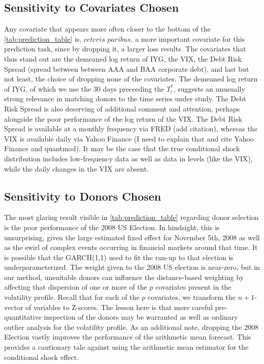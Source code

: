 \documentclass[11pt,3p,review,authoryear]{elsarticle}
\theoremstyle{definition}
\begin{document}
\subsection{Sensitivity to Covariates Chosen}
Any covariate that appears more often closer to the bottom of the \ref{tab:prediction_table} is, $\textit{ceteris paribus}$, a more important covariate for this prediction task, since by dropping it, a larger loss results.  The covariates that thus stand out are the demeaned log return of IYG, the VIX, the Debt Risk Spread (spread between between AAA and BAA corporate debt), and last but not least, the choice of dropping none of the covariates.  The demeaned log return of IYG, of which we use the 30 days preceeding the $T_{i}^{*}$, suggests an unusually strong relevance in matching donors to the time series under study.  The Debt Risk Spread is also deserving of additional comment and attention, perhaps alongside the poor performance of the log return of the VIX.  The Debt Risk Spread is available at a monthly frequency via FRED (add citation), whereas the VIX is available daily via Yahoo Finance (I need to explain that and cite Yahoo Finance and quantmod).  It may be the case that the true conditional shock distribution includes low-frequency data as well as data in levels (like the VIX), while the daily changes in the VIX are absent.

\subsection{Sensitivity to Donors Chosen}

The most glaring result visible in \ref{tab:prediction_table} regarding donor selection is the poor performance of the 2008 US Election.  In hindsight, this is unsurprising, given the large estimated fixed effect for November 5th, 2008 as well as the swirl of complex events occurring in financial markets around that time.  It is possible that the GARCH(1,1) used to fit the run-up to that election is underparameterized.  The weight given to the 2008 US election is near-zero, but in our method, unsuitable donors can influence the distance-based weighting by affecting that dispersion of one or more of the $p$ covariates present in the volatility profile.  Recall that for each of the $p$ covariates, we transform the $n+1$-vector of variables to Z-scores.  The lesson here is that more careful pre-quantitative inspection of the donors may be warranted as well as ordinary outlier analysis for the volatility profile.  As an additional note, dropping the 2008 Election vastly improves the performance of the arithmetic mean forecast.  This provides a cautionary tale against using the arithmetic mean estimator for the conditional shock effect.  
\end{document}
